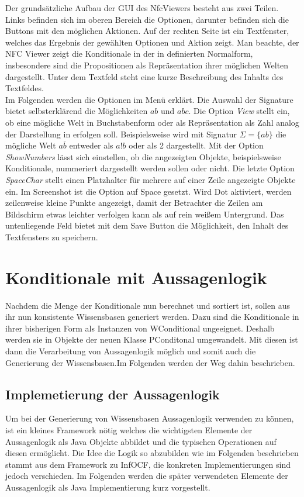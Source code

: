 \documentclass[12pt,a4paper]{article}
\begin{document}
Der grundsätzliche Aufbau der GUI des NfcViewers besteht aus zwei Teilen. Links befinden sich im oberen Bereich die Optionen, darunter befinden sich die Buttons mit den möglichen Aktionen. Auf der rechten Seite ist ein Textfenster, welches das Ergebnis der gewählten Optionen und Aktion zeigt. Man beachte, der NFC Viewer zeigt die Konditionale in der in \cite{beierle19} definierten Normalform, insbesondere sind die Propositionen als Repräsentation ihrer möglichen Welten dargestellt. Unter dem Textfeld steht eine kurze Beschreibung des Inhalts des Textfeldes. \\
Im Folgenden werden die Optionen im Menü erklärt. Die Auswahl der Signature bietet selbsterklärend die Möglichkeiten $ab$ und $abc$. Die Option \textit{View} stellt ein, ob eine mögliche Welt in Buchstabenform oder als Repräsentation als Zahl analog der Darstellung in \cite{beierle19} erfolgen soll. Beispielsweise wird mit Signatur $\Sigma=\{ab\}$ die mögliche Welt $a \overline{b}$ entweder als $a!b$ oder als 2 dargestellt. Mit der Option \textit{ShowNumbers} lässt sich einstellen, ob die angezeigten Objekte, beispielsweise Konditionale, nummeriert dargestellt werden sollen oder nicht. Die letzte Option \textit{SpaceChar} stellt einen Platzhalter für mehrere auf einer Zeile angezeigte Objekte ein. Im Screenshot ist die Option auf Space gesetzt. Wird Dot aktiviert, werden zeilenweise kleine Punkte angezeigt, damit der Betrachter die Zeilen am Bildschirm etwas leichter verfolgen kann als auf rein weißem Untergrund. Das untenliegende Feld bietet mit dem Save Button die Möglichkeit, den Inhalt des Textfensters zu speichern.



\section{Konditionale mit Aussagenlogik}
Nachdem die Menge der Konditionale nun berechnet und sortiert ist, sollen aus ihr nun konsistente Wissensbasen generiert werden. Dazu sind die Konditionale in ihrer bisherigen Form als Instanzen von WConditional ungeeignet. Deshalb werden sie in Objekte der neuen Klasse PConditonal umgewandelt. Mit diesen ist dann die Verarbeitung von Aussagenlogik möglich und somit auch die Generierung der Wissensbasen.Im Folgenden werden der Weg dahin beschrieben.




\subsection{Implemetierung der Aussagenlogik}
\label{sec:logic}
Um bei der Generierung von Wissensbasen Aussagenlogik verwenden zu können, ist ein kleines Framework nötig welches die wichtigsten Elemente der Aussagenlogik als Java Objekte abbildet und die typischen Operationen auf diesen ermöglicht. Die Idee die Logik so abzubilden wie im Folgenden beschrieben stammt aus dem Framework zu InfOCF, die konkreten Implementierungen sind jedoch verschieden. Im Folgenden werden die später verwendeten Elemente der Aussagenlogik als Java Implementierung kurz vorgestellt. \\
\end{document}
